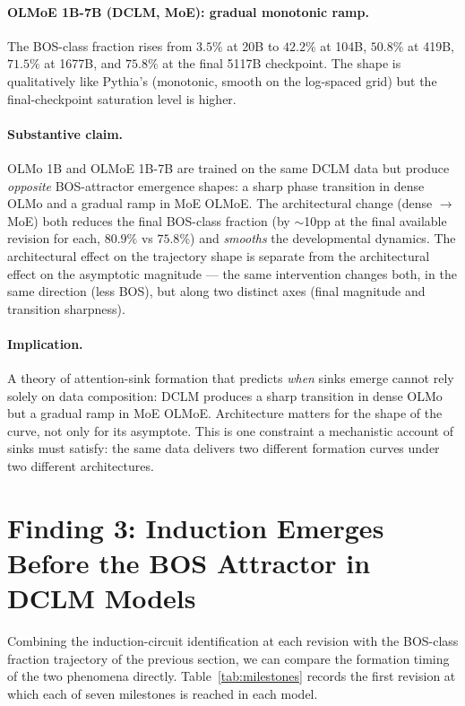 \documentclass[11pt]{article}
\begin{document}
\paragraph{OLMoE 1B-7B (DCLM, MoE): gradual monotonic ramp.} The BOS-class
fraction rises from $3.5\%$ at 20B to $42.2\%$ at 104B, $50.8\%$ at 419B,
$71.5\%$ at 1677B, and $75.8\%$ at the final 5117B checkpoint. The shape
is qualitatively like Pythia's (monotonic, smooth on the log-spaced grid)
but the final-checkpoint saturation level is higher.

\paragraph{Substantive claim.} OLMo 1B and OLMoE 1B-7B are trained on the
same DCLM data but produce \emph{opposite} BOS-attractor emergence shapes:
a sharp phase transition in dense OLMo and a gradual ramp in MoE OLMoE.
The architectural change (dense $\to$ MoE) both reduces the final
BOS-class fraction (by $\sim$10pp at the final available revision for
each, $80.9\%$ vs $75.8\%$) and \emph{smooths} the developmental dynamics.
The architectural effect on the trajectory shape is separate from the
architectural effect on the asymptotic magnitude --- the same intervention
changes both, in the same direction (less BOS), but along two distinct
axes (final magnitude and transition sharpness).

\paragraph{Implication.} A theory of attention-sink formation that
predicts \emph{when} sinks emerge cannot rely solely on data composition:
DCLM produces a sharp transition in dense OLMo but a gradual ramp in MoE
OLMoE. Architecture matters for the shape of the curve, not only for its
asymptote. This is one constraint a mechanistic account of sinks must
satisfy: the same data delivers two different formation curves under two
different architectures.

\section{Finding 3: Induction Emerges Before the BOS Attractor in DCLM Models}
\label{sec:f3}

Combining the induction-circuit identification at each revision with the
BOS-class fraction trajectory of the previous section, we can compare the
formation timing of the two phenomena directly. Table~\ref{tab:milestones}
records the first revision at which each of seven milestones is reached
in each model.
\end{document}
